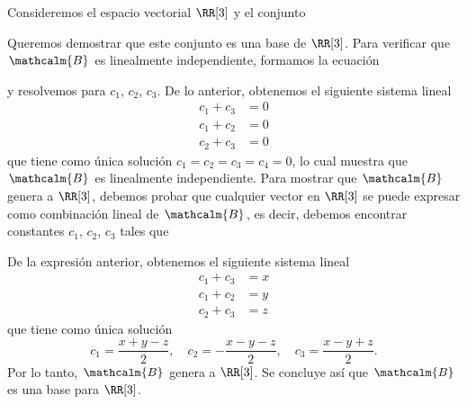 \begin{examplebox}{}{}
    Consideremos el espacio vectorial $\RR[3]$ y el conjunto
    \begin{matrizn}
    \end{matrizn}
    Queremos demostrar que este conjunto es una base de $\RR[3]$. Para verificar que $\mathcalm{B}$ es linealmente independiente, formamos la ecuación
    \begin{matrizn}
    \end{matrizn}
    y resolvemos para $c_1$, $c_2$, $c_3$. De lo anterior, obtenemos el siguiente sistema lineal
    \begin{align*}
        c_1 + c_3 & = 0 \\
        c_1 + c_2 & = 0 \\
        c_2 + c_3 & = 0
    \end{align*}
    que tiene como única solución $c_1 = c_2 = c_3 = c_4 = 0$, lo cual muestra que $\mathcalm{B}$ es linealmente independiente. Para mostrar que $\mathcalm{B}$ genera a $\RR[3]$, debemos probar que cualquier vector en $\RR[3]$ se puede expresar como combinación lineal de $\mathcalm{B}$, es decir, debemos encontrar constantes $c_1$, $c_2$, $c_3$ tales que
    \begin{matrizn}
    \end{matrizn}
    De la expresión anterior, obtenemos el siguiente sistema lineal
    \begin{align*}
        c_1 + c_3 & = x \\
        c_1 + c_2 & = y \\
        c_2 + c_3 & = z
    \end{align*}
    que tiene como única solución
    $$c_1 = \frac{x + y - z}{2}, \quad c_2 = - \frac{x - y - z}{2}, \quad c_3 = \frac{x - y + z}{2}.$$
    Por lo tanto, $\mathcalm{B}$ genera a $\RR[3]$. Se concluye así que $\mathcalm{B}$ es una base para $\RR[3]$.
\end{examplebox}

